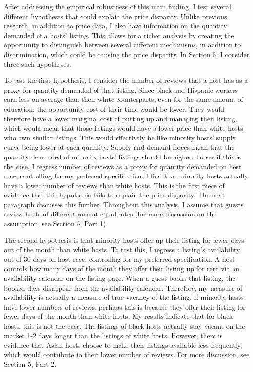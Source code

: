 After addressing the empirical robustness of this main finding, I test several different hypotheses that could explain the price disparity. Unlike previous research, in addition to price data, I also have information on the quantity demanded of a hosts' listing. This allows for a richer analysis by creating the opportunity to distinguish between several different mechanisms, in addition to discrimination, which could be causing the price disparity. In Section 5, I consider three such hypotheses. 


To test the first hypothesis, I consider the number of reviews that a host has as a proxy for quantity demanded of that listing. Since black and Hispanic workers earn less on average than their white counterparts, even for the same amount of education, the opportunity cost of their time would be lower.\cite{Economic Policy Institute, State of Working America Data Library, ?Wages by education,? 2016.} They would therefore have a lower marginal cost of putting up and managing their listing, which would mean that those listings would have a lower price than white hosts who own similar listings. This would effectively be like minority hosts' supply curve being lower at each quantity. Supply and demand forces mean that the quantity demanded of minority hosts' listings should be higher. To see if this is the case, I regress number of reviews as a proxy for quantity demanded on host race, controlling for my preferred specification. I find that minority hosts actually have a lower number of reviews than white hosts. This is the first piece of evidence that this hypothesis fails to explain the price disparity. The next paragraph discusses this further. Throughout this analysis, I assume that guests review hosts of different race at equal rates (for more discussion on this assumption, see Section 5, Part 1). 

The second hypothesis is that  minority hosts offer up their listing for fewer days out of the month than white hosts. To test this, I regress a listing's availability out of 30 days on host race, controlling for my preferred specification. A host controls how many days of the month they offer their listing up for rent via an availability calendar on the listing page. When a guest books that listing, the booked days disappear from the availability calendar. Therefore, my measure of availability is actually a measure of true vacancy of the listing. If minority hosts have lower numbers of reviews, perhaps this is because they offer their listing for fewer days of the month than white hosts. My results indicate that for black hosts, this is not the case. The listings of black hosts actually stay vacant on the market 1-2 days longer than the listings of white hosts. However, there is evidence that Asian hosts choose to make their listings available less frequently, which would contribute to their lower number of reviews. For more discussion, see Section 5, Part 2.      

